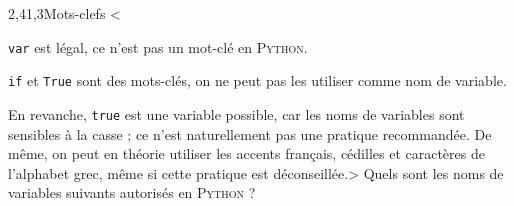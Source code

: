 \begin{quiz}[title={Variable, objet et typage dynamique}]
\begin{quizquestion}[b]{2,4}{1,3}{Mots-clefs}
<\begin{jazzitemize}
	\item \texttt{var} est légal, ce n'est pas un mot-clé en \textsc{Python}.
	\item \texttt{if} et \texttt{True} sont des mots-clés, on ne peut pas les utiliser comme nom de variable.
\end{jazzitemize}
En revanche, \texttt{true} est une variable possible, car les noms de variables sont sensibles à la casse ; ce n'est naturellement pas une pratique recommandée.
De même, on peut en théorie utiliser les accents français, cédilles et caractères de l'alphabet grec, même si cette pratique est déconseillée.>
Quels sont les noms de variables suivants autorisés en \textsc{Python} ?
\end{quizquestion}
\end{quiz}


